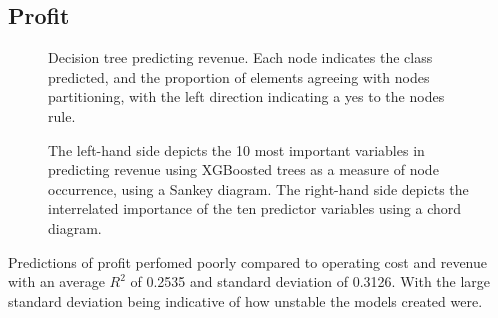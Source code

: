 \documentclass[review,12pt,authoryear]{elsarticle}
\begin{document}
\begin{linenumbers}
 \subsection{Profit}

\begin{figure} 
  \caption{Decision tree predicting revenue. Each node indicates the class predicted, and the proportion of elements agreeing with nodes partitioning, with the left direction indicating a yes to the nodes rule.}\label{fig:revenue_tree}
 \end{figure}
 
 \begin{figure}
  \caption{The left-hand side depicts the 10 most important variables in predicting revenue using XGBoosted trees as a measure of node occurrence, using a Sankey diagram. The right-hand side depicts the interrelated importance of the ten predictor variables using a chord diagram.}\label{fig:revenue_sankey}
 \end{figure}

Predictions of profit perfomed poorly compared to operating cost and revenue with an average $R^2$ of 0.2535 and standard deviation of 0.3126. With the large standard deviation being indicative of how unstable the models created were.

\end{linenumbers}
 
\end{document}
